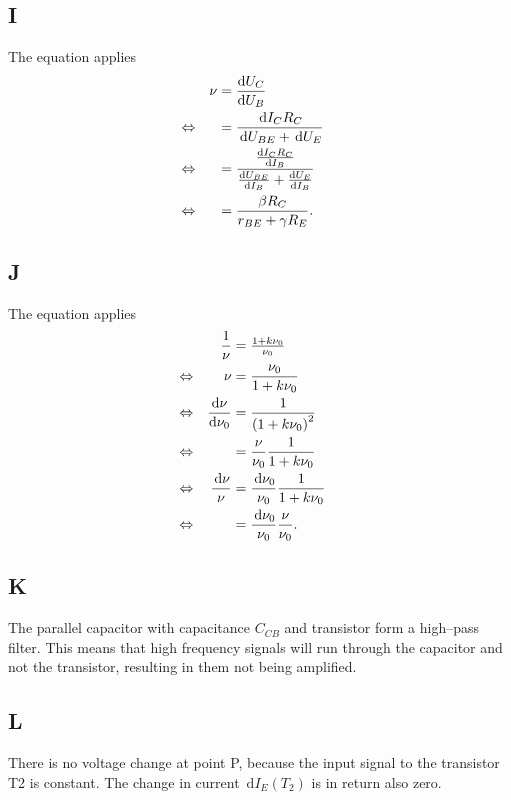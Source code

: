 \documentclass[a4paper,10pt]{article}
\newcommand{\td}{\,\text{d}}
\numberwithin{equation}{section}
\begin{document}
\begin{multicols}{2}
	\subsection{I}
	The equation applies
	\begin{align}
		                &  & \nu & = \diff[]{U_C}{U_B}                                                    &  &           \\
		\Leftrightarrow &  &     & = \dfrac{\td I_CR_C}{\td U_{BE}+\td U_E}                               &  & \nonumber \\
		\Leftrightarrow &  &     & = \dfrac{\diff[]{I_CR_C}{I_B}}{\diff[]{U_{BE}}{I_B}+\diff[]{U_E}{I_B}} &  & \nonumber \\
		\Leftrightarrow &  &     & = \dfrac{\beta R_C}{r_{BE}+\gamma R_E}.                                &  &
	\end{align}

	\subsection{J}
	The equation applies
	\begin{align}
		                &  & \dfrac{1}{\nu}       & = \tfrac{1+k\nu _0}{\nu _0}                   &  &           \\
		\Leftrightarrow &  & \nu                  & = \dfrac{\nu_0}{1+k\nu_0}                     &  & \nonumber \\
		\Leftrightarrow &  & \diff[]{\nu}{\nu_0}  & = \dfrac{1}{\left(1+k\nu_0\right)^2}          &  & \nonumber \\
		\Leftrightarrow &  &                      & = \dfrac{\nu}{\nu_0}\dfrac{1}{1+k\nu_0}       &  & \nonumber \\
		\Leftrightarrow &  & \dfrac{\td \nu}{\nu} & = \dfrac{\td \nu_0}{\nu_0}\dfrac{1}{1+k\nu_0} &  & \nonumber \\
		\Leftrightarrow &  &                      & = \dfrac{\td \nu_0}{\nu_0}\dfrac{\nu}{\nu_0}. &  &
	\end{align}

	\subsection{K}
	The parallel capacitor with capacitance $C_{CB}$ and transistor form a high--pass filter.
	This means that high frequency signals will run through the capacitor and not the transistor, resulting in them not being amplified.

	\subsection{L}
	There is no voltage change at point P, because the input signal to the transistor T2 is constant.
	The change in current $\td I_E\left(T_2\right)$ is in return also zero.


\end{multicols}
\end{document}
